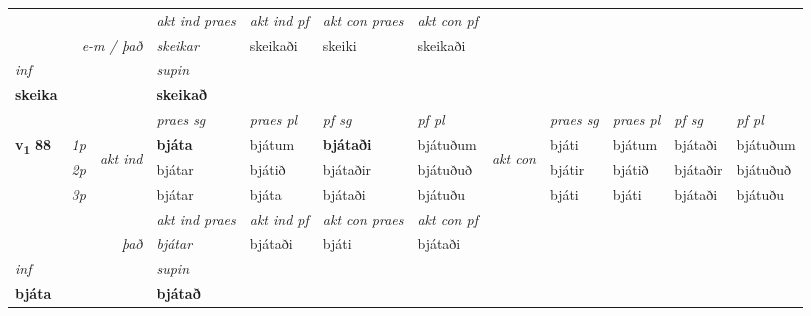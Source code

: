 \begin{longtable}[l]{X>{\footnotesize\itshape}llXXXXlXXXX}
   && &  \textit{akt ind praes} & \textit{akt ind pf} & \textit{akt con praes} & \textit{akt con pf} \\*
\multicolumn{3}{r}{\textit{e-m / það}} & skeikar & skeikaði & skeiki & skeikaði \\*

\cmidrule{4-7}
   {\textit{inf}} & &      & \textit{supin}   \\*
  {\textbf{skeika}} & &      &  \textbf{skeikað}   \\*

\midrule

 & &   & \textit{praes sg}  & \textit{praes pl}    & \textit{ pf sg} & \textit{pf pl} & & \textit{praes sg}  & \textit{praes pl}    & \textit{pf sg} & \textit{pf pl }  \\ \cmidrule{4-7} \cmidrule{9-12}
 \multirow{2}{*}{{{\textbf{v{\textsubscript{1}}} \Large{\textbf{88}}}}}  & 1p & \multirow{3}{*}{\begin{turn}{90}\textit{akt ind}\end{turn}} & \textbf{bjáta} & bjátum & \textbf{bjátaði} & bjátuðum & \multirow{3}{*}{\begin{turn}{90}\textit{akt con}\end{turn}} &bjáti & bjátum & bjátaði & bjátuðum\\*
 & 2p &  &  bjátar  & bjátið & bjátaðir & bjátuðuð & & bjátir & bjátið & bjátaðir & bjátuðuð \\*
 & 3p &  & bjátar & bjáta & bjátaði & bjátuðu & & bjáti & bjáti& bjátaði & bjátuðu \\*
\cmidrule{4-7} \cmidrule{9-12}

   && &  \textit{akt ind praes} & \textit{akt ind pf} & \textit{akt con praes} & \textit{akt con pf} \\*
\multicolumn{3}{r}{\textit{það}} & bjátar & bjátaði & bjáti & bjátaði \\*

\cmidrule{4-7}
   {\textit{inf}} & &      & \textit{supin}   \\*
  {\textbf{bjáta}} & &      &  \textbf{bjátað}   \\*

\midrule


\end{longtable}
